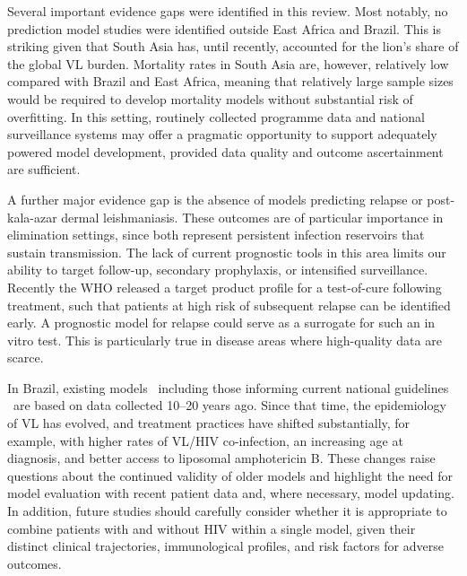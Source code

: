 Several important evidence gaps were identified in this review. Most notably, no prediction model studies were identified outside East Africa and Brazil. This is striking given that South Asia has, until recently, accounted for the lion's share of the global VL burden. Mortality rates in South Asia are, however, relatively low compared with Brazil and East Africa, meaning that relatively large sample sizes would be required to develop mortality models without substantial risk of overfitting. In this setting, routinely collected programme data and national surveillance systems may offer a pragmatic opportunity to support adequately powered model development, provided data quality and outcome ascertainment are sufficient.

A further major evidence gap is the absence of models predicting relapse or post-kala-azar dermal leishmaniasis. These outcomes are of particular importance in elimination settings, since both represent persistent infection reservoirs that sustain transmission\cite{who_sea_elim, WHO_nairobi_declaration}. The lack of current prognostic tools in this area limits our ability to target follow-up, secondary prophylaxis, or intensified surveillance. Recently the WHO released a target product profile for a test-of-cure following treatment, such that patients at high risk of subsequent relapse can be identified early\cite{WHO2024_Leishmaniasis}. A prognostic model for relapse could serve as a surrogate for such an in vitro test.  This is particularly true in disease areas where high-quality data are scarce.

In Brazil, existing models \textemdash\ including those informing current national guidelines\cite{Brasil_2024_GuiaVigilanciaSaude} \textemdash\ are based on data collected 10--20 years ago. Since that time, the epidemiology of VL has evolved, and treatment practices have shifted substantially, for example, with higher rates of VL/HIV co-infection, an increasing age at diagnosis, and better access to liposomal amphotericin B\cite{lima2018}. These changes raise questions about the continued validity of older models and highlight the need for model evaluation with recent patient data and, where necessary, model updating. In addition, future studies should carefully consider whether it is appropriate to combine patients with and without HIV within a single model, given their distinct clinical trajectories, immunological profiles, and risk factors for adverse outcomes\cite{cota2011}.

